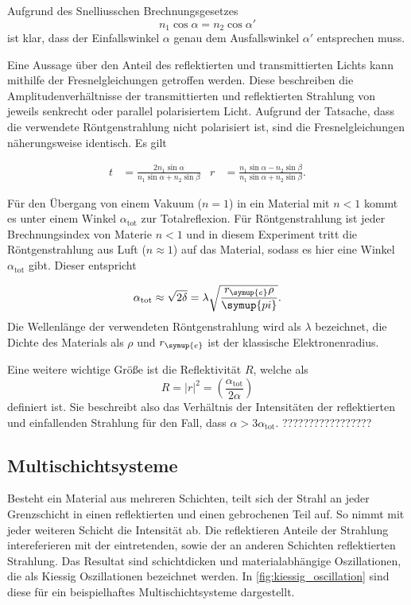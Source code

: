 Aufgrund des Snelliusschen Brechnungsgesetzes
\begin{equation*}
    n_1 \cos \alpha = n_2 \cos \alpha'
\end{equation*}
ist klar, dass der Einfallswinkel $\alpha$ genau dem Ausfallswinkel $\alpha'$ entsprechen muss.

Eine Aussage über den Anteil des reflektierten und transmittierten Lichts kann mithilfe der Fresnelgleichungen getroffen werden. Diese beschreiben die Amplitudenverhältnisse der 
transmittierten und reflektierten Strahlung von jeweils senkrecht oder parallel polarisiertem Licht. Aufgrund der Tatsache, dass die verwendete Röntgenstrahlung nicht polarisiert ist,
sind die Fresnelgleichungen näherungsweise identisch. Es gilt

\begin{align*}
    t &= \frac{2n_1\sin\alpha}{n_1\sin\alpha + n_2 \sin\beta} & r &= \frac{n_1\sin\alpha - n_2\sin\beta}{n_1\sin\alpha+n_2 \sin\beta}.
\end{align*}

Für den Übergang von einem Vakuum ($n=1$) in ein Material mit $n<1$ kommt es unter einem Winkel $\alpha_{\text{tot}}$ zur Totalreflexion. Für Röntgenstrahlung ist jeder Brechnungsindex 
von Materie $n<1$ und in diesem Experiment tritt die Röntgenstrahlung aus Luft ($n \approx 1$) auf das Material, sodass es hier eine Winkel $\alpha_{\text{tot}}$ gibt. Dieser entspricht

\begin{equation}
    \alpha_{\text{tot}} \approx \sqrt{2\delta} = \lambda \sqrt{\frac{r_{\symup{e}}\rho}{\symup{pi}}}.
    \label{eq:alpha_tot}
\end{equation}
Die Wellenlänge der verwendeten Röntgenstrahlung wird als $\lambda$ bezeichnet, die Dichte des Materials als $\rho$ und $r_{\symup{e}}$ ist der klassische Elektronenradius.

Eine weitere wichtige Größe ist die Reflektivität $R$, welche als
\begin{equation}
    R = |{r}|^2 = \left(\frac{\alpha_{\text{tot}}}{2\alpha}\right)
    \label{eq:Reflektivität}
\end{equation}
definiert ist. Sie beschreibt also das Verhältnis der Intensitäten der reflektierten und einfallenden Strahlung für den Fall, dass $\alpha > 3 \alpha_{\text{tot}}$. ?????????????????

\subsection{Multischichtsysteme}
Besteht ein Material aus mehreren Schichten, teilt sich der Strahl an jeder Grenzschicht in einen reflektierten und einen gebrochenen Teil auf. So nimmt mit jeder weiteren Schicht
die Intensität ab. Die reflektieren Anteile der Strahlung intereferieren mit der eintretenden, sowie der an anderen Schichten reflektierten Strahlung. Das Resultat sind schichtdicken
und materialabhängige Oszillationen, die als Kiessig Oszillationen bezeichnet werden. In \autoref{fig:kiessig_oscillation} sind diese für ein beispielhaftes Multischichtsysteme dargestellt.

